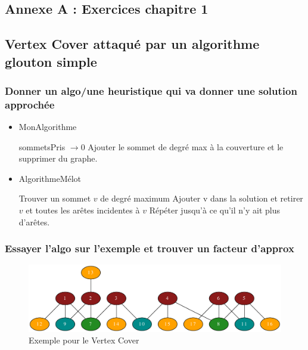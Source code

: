 \documentclass{article}
\begin{document}
\begin{sffamily}
\section{Annexe A : Exercices chapitre 1}\label{exochap1}

\subsection{Vertex Cover attaqué par un algorithme glouton simple}

\subsubsection*{Donner un algo/une heuristique qui va donner une solution approchée}

\begin{itemize}
\item[]
\begin{algorithm}[h!]
\caption{MonAlgorithme}
\begin{algorithmic}[1]
\STATE sommetsPris $\rightarrow 0$
\STATE Ajouter le sommet de degré max à la couverture et le supprimer du graphe.
\ENDWHILE
\end{algorithmic}
\end{algorithm}
\item[]
\begin{algorithm}[h!]
\caption{AlgorithmeMélot}
\begin{algorithmic}[1]
\STATE Trouver un sommet $v$ de degré maximum
\STATE Ajouter v dans la solution et retirer $v$ et toutes les arêtes incidentes à $v$
\STATE Répéter jusqu'à ce qu'il n'y ait plus d'arêtes.
\end{algorithmic}
\end{algorithm}
\end{itemize}

\subsubsection*{Essayer l'algo sur l'exemple et trouver un facteur d'approx}

\begin{figure}[h!]
    \begin{center}
    \includegraphics[width=\textwidth]{exo_1_5.pdf}
    \caption{Exemple pour le Vertex Cover}
    \end{center}
\end{figure}


\end{sffamily}
\end{document}
